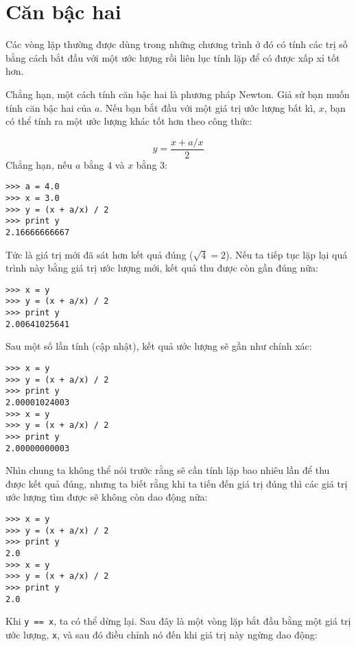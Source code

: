 \documentclass[11pt]{book}
\begin{document}
\section{Căn bậc hai}


Các vòng lặp thường được dùng trong những chương trình ở đó
có tính các trị số bằng cách bắt đầu với một ước lượng rồi liên lục
tính lặp để có được xấp xỉ tốt hơn.


Chẳng hạn, một cách tính căn bậc hai là phương pháp Newton. Giả sử
bạn muốn tính căn bậc hai của $a$. Nếu bạn bắt đầu với một giá trị
ước lượng bất kì, $x$, bạn có thể tính ra một ước lượng khác
tốt hơn theo công thức:

\[ y = \frac{x + a/x}{2} \]
%
Chẳng hạn, nếu $a$ bằng 4 và $x$ bằng 3:

\beforeverb
\begin{verbatim}
>>> a = 4.0
>>> x = 3.0
>>> y = (x + a/x) / 2
>>> print y
2.16666666667
\end{verbatim}
\afterverb
%
Tức là giá trị mới đã sát hơn kết quả đúng ($\sqrt{4} = 2$). Nếu ta
tiếp tục lặp lại quá trình này bằng giá trị ước lượng mới, kết quả
thu được còn gần đúng nữa:

\beforeverb
\begin{verbatim}
>>> x = y
>>> y = (x + a/x) / 2
>>> print y
2.00641025641
\end{verbatim}
\afterverb
%
Sau một số lần tính (cập nhật), kết quả ước lượng sẽ gần như chính xác:


\beforeverb
\begin{verbatim}
>>> x = y
>>> y = (x + a/x) / 2
>>> print y
2.00001024003
>>> x = y
>>> y = (x + a/x) / 2
>>> print y
2.00000000003
\end{verbatim}
\afterverb
%
Nhìn chung ta không thể nói trước rằng sẽ cần tính lặp bao nhiêu
lần để thu được kết quả đúng, nhưng ta biết rằng khi ta tiến đến
giá trị đúng thì các giá trị ước lượng tìm được sẽ không còn dao động
nữa:

\beforeverb
\begin{verbatim}
>>> x = y
>>> y = (x + a/x) / 2
>>> print y
2.0
>>> x = y
>>> y = (x + a/x) / 2
>>> print y
2.0
\end{verbatim}
\afterverb
%
Khi {\tt y == x}, ta có thể dừng lại. Sau đây là một vòng lặp
bắt đầu bằng một giá trị ước lượng, {\tt x}, và sau đó điều chỉnh
nó đến khi giá trị này ngừng dao động:
\end{document}

